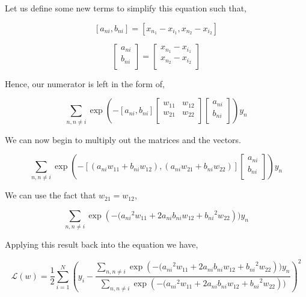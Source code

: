 \documentclass[submit]{harvardml}
\begin{document}
\begin{tcolorbox}[breakable]
Let us define some new terms to simplify this equation such that,

$$ [a_{ni}, b_{ni}] = [x_{n_1} - x_{i_1}, x_{n_2} - x_{i_2}] $$

$$ \left[ {\begin{array}{c}
   a_{ni}\\
   b_{ni}\\
\end{array} } \right] = 
\left[ {\begin{array}{c}
   x_{n_1} - x_{i_1}\\
   x_{n_2} - x_{i_2}\\
\end{array} } \right]$$

Hence, our numerator is left in the form of,

$$
\sum\limits_{n, n \neq i} \exp\left(-[a_{ni}, b_{ni}] 
\left[ {\begin{array}{cc}
   w_{11} & w_{12}\\
   w_{21} & w_{22}\\
\end{array} } \right] 
\left[ {\begin{array}{c}
   a_{ni}\\
   b_{ni}\\
\end{array} } \right] \right)y_n$$

We can now begin to multiply out the matrices and the vectors.

$$
\sum\limits_{n, n \neq i} \exp\left(-\left[(a_{ni}w_{11} + b_{ni}w_{12}),
(a_{ni}w_{21} + b_{ni}w_{22})\right] 
\left[ {\begin{array}{c}
   a_{ni}\\
   b_{ni}\\
\end{array} } \right] \right)y_n
$$

We can use the fact that $w_{21} = w_{12}$,

$$
\sum\limits_{n, n \neq i} \exp\left(- ({a_{ni}}^2w_{11} + 2a_{ni}b_{ni}w_{12} + {b_{ni}}^2w_{22}\right))y_n
$$

Applying this result back into the equation we have,

$$\boxed{\mathcal{L}(w) = \frac{1}{2}\sum\limits_{i = 1}^N \left( y_i - \frac{ \sum\limits_{n, n \neq i} \exp\left(- ({a_{ni}}^2w_{11} + 2a_{ni}b_{ni}w_{12} + {b_{ni}}^2w_{22}\right))y_n  }{ \sum\limits_{n, n \neq i} \exp\left(- ({a_{ni}}^2w_{11} + 2a_{ni}b_{ni}w_{12} + {b_{ni}}^2w_{22}\right)) } \right)^2}$$\\\\


\end{tcolorbox}
\end{document}
